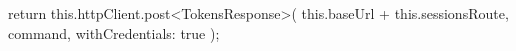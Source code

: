 \begin{spverbatim}
    return this.httpClient.post<TokensResponse>(
    this.baseUrl + this.sessionsRoute,
    command,
    { withCredentials: true });
\end{spverbatim}